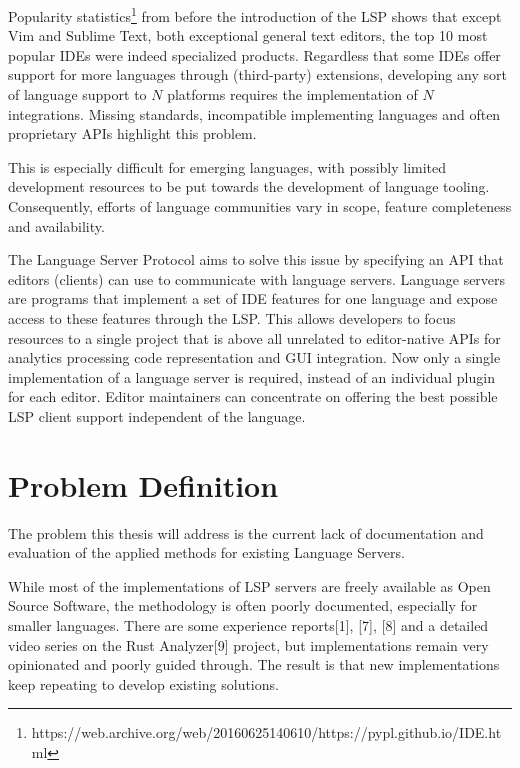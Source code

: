 \documentclass[
  a4paper,
  bibtex,
  english,
  nomenclature]{kthlatex/kththesis/kththesis}
\begin{document}
Popularity statistics\footnote{https://web.archive.org/web/20160625140610/https://pypl.github.io/IDE.html}
from before the introduction of the LSP shows that except Vim and
Sublime Text, both exceptional general text editors, the top 10 most
popular IDEs were indeed specialized products. Regardless that some IDEs
offer support for more languages through (third-party) extensions,
developing any sort of language support to \(N\) platforms requires the
implementation of \(N\) integrations. Missing standards, incompatible
implementing languages and often proprietary APIs highlight this
problem.

This is especially difficult for emerging languages, with possibly
limited development resources to be put towards the development of
language tooling. Consequently, efforts of language communities vary in
scope, feature completeness and availability.

The Language Server Protocol aims to solve this issue by specifying an
API that editors (clients) can use to communicate with language servers.
Language servers are programs that implement a set of IDE features for
one language and expose access to these features through the LSP. This
allows developers to focus resources to a single project that is above
all unrelated to editor-native APIs for analytics processing code
representation and GUI integration. Now only a single implementation of
a language server is required, instead of an individual plugin for each
editor. Editor maintainers can concentrate on offering the best possible
LSP client support independent of the language.

\hypertarget{sec:problem-definition}{%
\section{Problem Definition}\label{sec:problem-definition}}

The problem this thesis will address is the current lack of
documentation and evaluation of the applied methods for existing
Language Servers.

While most of the implementations of LSP servers are freely available as
Open Source Software, the methodology is often poorly documented,
especially for smaller languages. There are some experience
reports{[}1{]}, {[}7{]}, {[}8{]} and a detailed video series on the Rust
Analyzer{[}9{]} project, but implementations remain very opinionated and
poorly guided through. The result is that new implementations keep
repeating to develop existing solutions.
\end{document}
